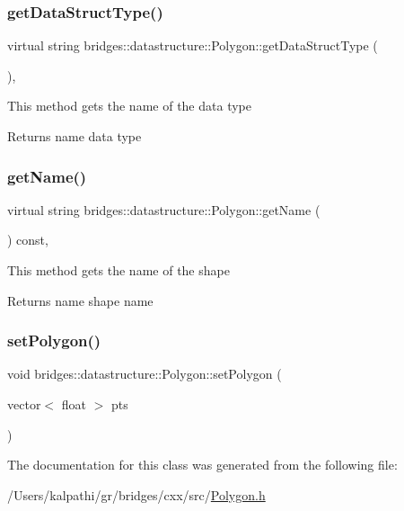 \subsubsection{\texorpdfstring{getDataStructType()}{getDataStructType()}}
{\footnotesize\ttfamily virtual string bridges\+::datastructure\+::\+Polygon\+::get\+Data\+Struct\+Type (\begin{DoxyParamCaption}{ }\end{DoxyParamCaption})\hspace{0.3cm}{\ttfamily [inline]}, {\ttfamily [virtual]}}

This method gets the name of the data type

\begin{DoxyReturn}{Returns}
name data type 
\end{DoxyReturn}
\mbox{\label{classbridges_1_1datastructure_1_1_polygon_a9e11131b2a1f3b6044913577f51546c3}} 
\subsubsection{\texorpdfstring{getName()}{getName()}}
{\footnotesize\ttfamily virtual string bridges\+::datastructure\+::\+Polygon\+::get\+Name (\begin{DoxyParamCaption}{ }\end{DoxyParamCaption}) const\hspace{0.3cm}{\ttfamily [inline]}, {\ttfamily [virtual]}}

This method gets the name of the shape

\begin{DoxyReturn}{Returns}
name shape name 
\end{DoxyReturn}
\mbox{\label{classbridges_1_1datastructure_1_1_polygon_a058a8ec2340f15f45dab27b18978055c}} 
\subsubsection{\texorpdfstring{setPolygon()}{setPolygon()}}
{\footnotesize\ttfamily void bridges\+::datastructure\+::\+Polygon\+::set\+Polygon (\begin{DoxyParamCaption}\item[{vector$<$ float $>$}]{pts }\end{DoxyParamCaption})\hspace{0.3cm}{\ttfamily [inline]}}



The documentation for this class was generated from the following file\+:\begin{DoxyCompactItemize}
\item 
/\+Users/kalpathi/gr/bridges/cxx/src/\mbox{\hyperlink{_polygon_8h}{Polygon.\+h}}\end{DoxyCompactItemize}
